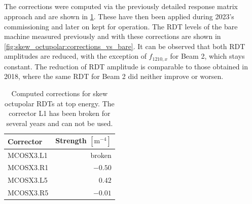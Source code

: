 \FloatBarrier
\subsection{}

The corrections were computed via the previously detailed response matrix approach and are shown in
\cref{tab:skew_octupolar:correction_strengths}. These have then been applied during 2023's
commissioning and later on kept for operation. The RDT levels of the bare machine measured
previously and with these corrections are shown in \cref{fig:skew_octupolar:corrections_vs_bare}. It
can be observed that both RDT amplitudes are reduced, with the exception of $f_{1210,x}$ for Beam 2,
which stays constant. The reduction of RDT amplitude is comparable to those obtained in 2018, where
the same RDT for Beam 2 did neither improve or worsen.


\begin{table}[!htb]
    \centering
    \begin{tabular}{lr}
      \toprule
      Corrector    &    Strength $[\text{m}^{-4}]$ \\
      \midrule
      MCOSX3.L1    &           broken  \\
      MCOSX3.R1    &           $-0.50$ \\
      MCOSX3.L5    &           $ 0.42$ \\
      MCOSX3.R5    &           $-0.01$ \\
      \bottomrule
    \end{tabular}
    \caption{Computed corrections for skew octupolar RDTs at top energy. The corrector L1 has been 
    broken for several years and can not be used.}
    \label{tab:skew_octupolar:correction_strengths}
\end{table}
 
